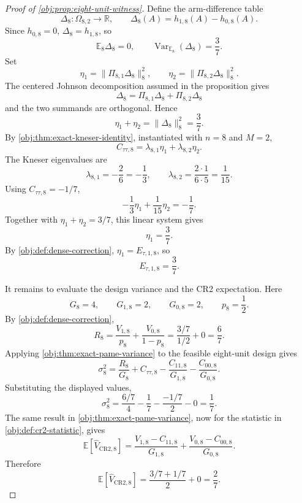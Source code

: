 \documentclass[11pt]{article}
\begin{document}
\begin{proof}[Proof of \cref{obj:prop:eight-unit-witness}]
Define the arm-difference table
\[
\Delta_8:\Omega_{8,2}\to\mathbb R,
\qquad
\Delta_8(A)=h_{1,8}(A)-h_{0,8}(A).
\]
Since \(h_{0,8}=0\), \(\Delta_8=h_{1,8}\), so
\[
\mathbb E_8\Delta_8=0,
\qquad
\operatorname{Var}_{\mathbb E_8}(\Delta_8)=\frac37 .
\]
Set
\[
\eta_1=\|\Pi_{8,1}\Delta_8\|_8^2,
\qquad
\eta_2=\|\Pi_{8,2}\Delta_8\|_8^2 .
\]
The centered Johnson decomposition assumed in the proposition gives
\[
\Delta_8=\Pi_{8,1}\Delta_8+\Pi_{8,2}\Delta_8
\]
and the two summands are orthogonal. Hence
\[
\eta_1+\eta_2
=
\|\Delta_8\|_8^2
=
\frac37 .
\]
By \cref{obj:thm:exact-kneser-identity}, instantiated with \(n=8\) and \(M=2\),
\[
C_{\tau\tau,8}
=
\lambda_{8,1}\eta_1+\lambda_{8,2}\eta_2 .
\]
The Kneser eigenvalues are
\[
\lambda_{8,1}=-\frac{2}{6}=-\frac13,
\qquad
\lambda_{8,2}=\frac{2\cdot 1}{6\cdot 5}=\frac1{15}.
\]
Using \(C_{\tau\tau,8}=-1/7\),
\[
-\frac13\eta_1+\frac1{15}\eta_2=-\frac17 .
\]
Together with \(\eta_1+\eta_2=3/7\), this linear system gives
\[
\eta_1=\frac37 .
\]
By \cref{obj:def:dense-correction}, \(\eta_1=E_{\tau,1,8}\), so
\[
E_{\tau,1,8}=\frac37 .
\]

It remains to evaluate the design variance and the CR2 expectation. Here
\[
G_8=4,\qquad G_{1,8}=2,\qquad G_{0,8}=2,\qquad p_8=\frac12 .
\]
By \cref{obj:def:dense-correction},
\[
R_8=\frac{V_{1,8}}{p_8}+\frac{V_{0,8}}{1-p_8}
=
\frac{3/7}{1/2}+0
=
\frac67 .
\]
Applying \cref{obj:thm:exact-pame-variance} to the feasible eight-unit design gives
\[
\sigma_8^2
=
\frac{R_8}{G_8}
+
C_{\tau\tau,8}
-
\frac{C_{11,8}}{G_{1,8}}
-
\frac{C_{00,8}}{G_{0,8}}.
\]
Substituting the displayed values,
\[
\sigma_8^2
=
\frac{6/7}{4}
-\frac17
-\frac{-1/7}{2}
-0
=
\frac17 .
\]
The same result in \cref{obj:thm:exact-pame-variance}, now for the statistic in \cref{obj:def:cr2-statistic}, gives
\[
\mathbb E\!\left[\widehat V_{\mathrm{CR2},8}\right]
=
\frac{V_{1,8}-C_{11,8}}{G_{1,8}}
+
\frac{V_{0,8}-C_{00,8}}{G_{0,8}}.
\]
Therefore
\[
\mathbb E\!\left[\widehat V_{\mathrm{CR2},8}\right]
=
\frac{3/7+1/7}{2}+0
=
\frac27 .
\]
\end{proof}
\end{document}
